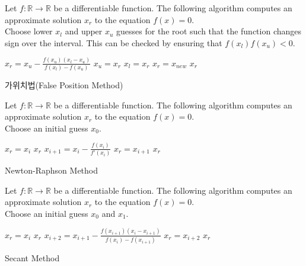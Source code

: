\begin{algorithm}\label{alg:c5}
Let $f:\mathbb{R}\rightarrow\mathbb{R}$ be a differentiable function. The following algorithm computes an approximate solution $x_{r}$ to the equation $f(x)=0$.\\
Choose lower $x_{l}$ and upper $x_{u}$ guesses for the root such that the function changes sign over the interval. This can be checked by ensuring that $f(x_{l})f(x_{u})<0$.
\begin{algorithmic}
  \State $x_{r}=x_{u}-\frac{f(x_{u})(x_l -x_u)}{f(x_l)-f(x_u)}$
    \State $x_{u}=x_{r}$
  \Else
    \State $x_{l}=x_{r}$
  \EndIf  
    \State $x_{r}=x_{new}$
    \State \Return $x_{r}$
  \EndIf
\EndWhile
\end{algorithmic}
\caption{가위치법(False Position Method)}
\end{algorithm}

\begin{algorithm}\label{alg:c1}
Let $f:\mathbb{R}\rightarrow\mathbb{R}$ be a differentiable function. The following algorithm computes an approximate solution $x_{r}$ to the equation $f(x)=0$.\\
Choose an initial guess $x_{0}$.
\begin{algorithmic}
    \State $x_{r}=x_{i}$
    \State \Return $x_{r}$
  \EndIf
  \State $x_{i+1}=x_{i}-\frac{f(x_{i})}{f'(x_{i})}$
    \State $x_{r}=x_{i+1}$
    \State \Return $x_{r}$
  \EndIf
\EndFor
\end{algorithmic}
\caption{Newton-Raphson Method}
\end{algorithm}

\begin{algorithm}\label{alg:c2}
Let $f:\mathbb{R}\rightarrow\mathbb{R}$ be a differentiable function. The following algorithm computes an approximate solution $x_{r}$ to the equation $f(x)=0$.\\
Choose an initial guess $x_{0}$ and $x_{1}$.
\begin{algorithmic}
    \State $x_{r}=x_{i}$
    \State \Return $x_{r}$
  \EndIf
  \State $x_{i+2}=x_{i+1}-\frac{f(x_{i+1})(x_{i}-x_{i+1})}{f(x_{i})-f(x_{i+1})}$
    \State $x_{r}=x_{i+2}$
    \State \Return $x_{r}$
  \EndIf
\EndFor
\end{algorithmic}
\caption{Secant Method}
\end{algorithm}

